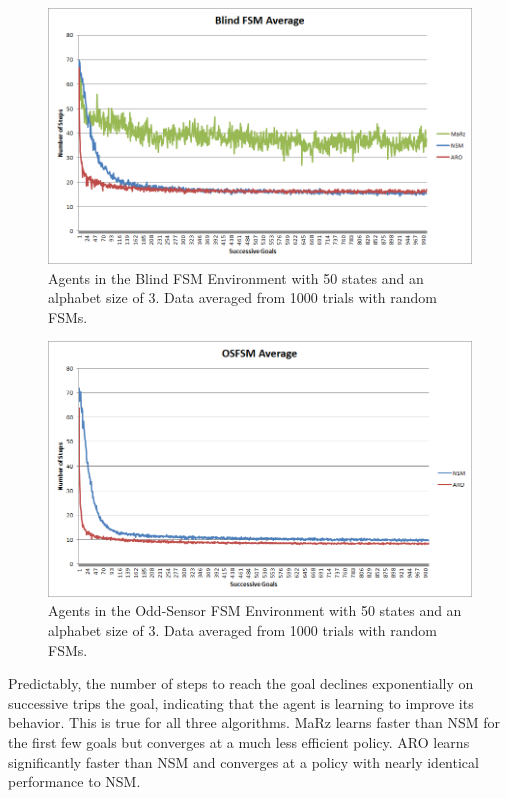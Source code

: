 \documentclass[letterpaper]{article} %
\begin{document}
\begin{figure}[t]
  \centering
  \includegraphics[width=0.9\columnwidth]{BlindFSMGraph.png} %
  \caption{Agents in the Blind FSM Environment with 50 states and an alphabet size of 3. Data averaged from 1000 trials with random FSMs.}
  \label{fig4}
\end{figure}

\begin{figure}[t]
	\centering
	\includegraphics[width=0.9\columnwidth]{OSFSMGraph.png} %
	\caption{Agents in the Odd-Sensor FSM Environment with 50 states and an alphabet size of 3. Data averaged from 1000 trials with random FSMs.}
	\label{fig5}
\end{figure}

Predictably, the number of steps to reach the goal declines
exponentially on successive trips the goal, indicating that the agent
is learning to improve its behavior.  This is true for all three
algorithms. MaRz learns faster than NSM for the first few goals but
converges at a much less efficient policy.  ARO learns significantly
faster than NSM and converges at a policy with nearly identical
performance to NSM.
\end{document}
